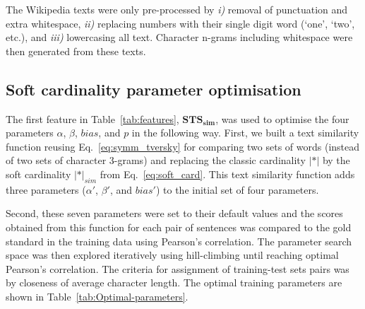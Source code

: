 The Wikipedia texts were only pre-processed by 
\emph{i)} removal of punctuation and extra whitespace, 
\emph{ii)} replacing numbers with their single digit word (`one', `two', etc.), 
and \emph{iii)} lowercasing all text. 
Character n-grams including whitespace were then generated from these texts. 

\subsection{Soft cardinality parameter optimisation}
\label{softcard-optimisation}

The first feature  in Table~\ref{tab:features}, $\mathbf{STS_{sim}}$, was used
to optimise the four parameters $\alpha$, $\beta$, $bias$, and $p$ in the following way.
First, we built a text similarity function reusing Eq.~\ref{eq:symm_tversky}
for comparing two sets of words (instead of two sets of character
3-grams) and replacing the classic cardinality $|*|$ by the soft
cardinality $|*|_{sim}$ from Eq.~\ref{eq:soft_card}. This text similarity
function adds three parameters ($\alpha'$, $\beta'$, and $bias'$) to
the initial set of four parameters.

Second, these seven parameters were set to their default values and the
scores obtained from this function for each pair of sentences was compared
to the gold standard in the training data using Pearson's correlation.
The parameter search space was then explored iteratively using
hill-climbing until reaching optimal Pearson's correlation. 
The criteria for assignment of training-test
sets pairs was by closeness of average character length.
The optimal training parameters are shown in Table~\ref{tab:Optimal-parameters}.

